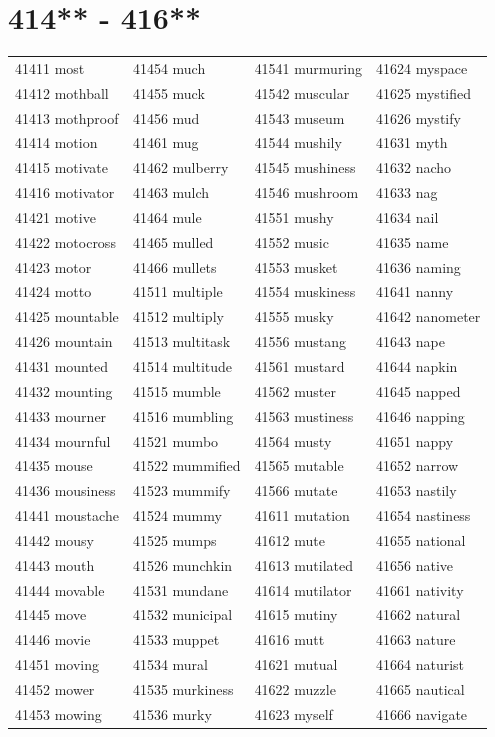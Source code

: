 \documentclass[10pt, oneside]{book}
\begin{document}
\begin{table}
	\centering
	\section*{414** - 416**}
	\begin{tabular}{l l l l}
41411 most &41454 much &41541 murmuring &41624 myspace\\
41412 mothball &41455 muck &41542 muscular &41625 mystified\\
41413 mothproof &41456 mud &41543 museum &41626 mystify\\
41414 motion &41461 mug &41544 mushily &41631 myth\\
41415 motivate &41462 mulberry &41545 mushiness &41632 nacho\\
41416 motivator &41463 mulch &41546 mushroom &41633 nag\\
41421 motive &41464 mule &41551 mushy &41634 nail\\
41422 motocross &41465 mulled &41552 music &41635 name\\
41423 motor &41466 mullets &41553 musket &41636 naming\\
41424 motto &41511 multiple &41554 muskiness &41641 nanny\\
41425 mountable &41512 multiply &41555 musky &41642 nanometer\\
41426 mountain &41513 multitask &41556 mustang &41643 nape\\
41431 mounted &41514 multitude &41561 mustard &41644 napkin\\
41432 mounting &41515 mumble &41562 muster &41645 napped\\
41433 mourner &41516 mumbling &41563 mustiness &41646 napping\\
41434 mournful &41521 mumbo &41564 musty &41651 nappy\\
41435 mouse &41522 mummified &41565 mutable &41652 narrow\\
41436 mousiness &41523 mummify &41566 mutate &41653 nastily\\
41441 moustache &41524 mummy &41611 mutation &41654 nastiness\\
41442 mousy &41525 mumps &41612 mute &41655 national\\
41443 mouth &41526 munchkin &41613 mutilated &41656 native\\
41444 movable &41531 mundane &41614 mutilator &41661 nativity\\
41445 move &41532 municipal &41615 mutiny &41662 natural\\
41446 movie &41533 muppet &41616 mutt &41663 nature\\
41451 moving &41534 mural &41621 mutual &41664 naturist\\
41452 mower &41535 murkiness &41622 muzzle &41665 nautical\\
41453 mowing &41536 murky &41623 myself &41666 navigate\\
	\end{tabular}
 \end{table}
\clearpage
\end{document}
